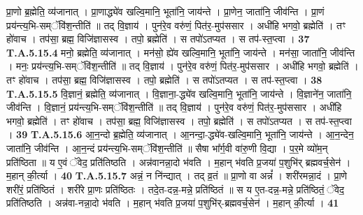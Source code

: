 \documentclass[17pt]{extarticle}
\begin{document}
                  प्रा॒णो ब्र॒ह्मेति॒ व्य॑जानात् । प्रा॒णाद्ध्ये॑व खल्वि॒मानि॒ भूता॑नि॒ जाय॑न्ते । प्रा॒णेन॒ जाता॑नि॒ जीव॑न्ति ।  प्रा॒णं प्रय॑न्त्य॒भि-सम्ॅवि॑श॒न्तीति॑ ॥ तद् वि॒ज्ञाय॑ ।  पुन॑रे॒व वरु॑णं॒ पित॑र॒-मुप॑ससार । अधी॑हि भगवो॒ ब्रह्मेति॑ । तꣳ हो॑वाच । तप॑सा॒ ब्रह्म॒ विजि॑ज्ञासस्व । तपो॒ ब्रह्मेति॑ । स तपो॑ऽतप्यत । स तप॑-स्त॒प्त्वा । \textbf{ 37} \newline
                  \newline
                                                                  \textbf{ T.A.5.15.4} \newline
                  मनो॒ ब्रह्मेति॒ व्य॑जानात् । मन॑सो॒ ह्ये॑व खल्वि॒मानि॒ भूता॑नि॒ जाय॑न्ते । मन॑सा॒ जाता॑नि॒ जीव॑न्ति । मनः॒ प्रय॑न्त्य॒भि-सम्ॅवि॑श॒न्तीति॑ ॥ तद् वि॒ज्ञाय॑ । पुन॑रे॒व वरु॑णं॒ पित॑र॒-मुप॑ससार । अधी॑हि भगवो॒ ब्रह्मेति॑ । तꣳ हो॑वाच । तप॑सा॒ ब्रह्म॒ विजि॑ज्ञासस्व ।  तपो॒ ब्रह्मेति॑ । स तपो॑ऽतप्यत । स तप॑-स्त॒प्त्वा । \textbf{ 38} \newline
                  \newline
                                                                  \textbf{ T.A.5.15.5} \newline
                  वि॒ज्ञानं॒ ब्रह्मेति॒ व्य॑जानात् ।  वि॒ज्ञाना॒-द्ध्ये॑व खल्वि॒मानि॒ भूता॑नि॒ जाय॑न्ते ।  वि॒ज्ञाने॑न॒ जाता॑नि॒ जीव॑न्ति । वि॒ज्ञानं॒ प्रय॑न्त्य॒भि-सम्ॅवि॑श॒न्तीति॑ ॥  तद् वि॒ज्ञाय॑ । पुन॑रे॒व वरु॑णं॒ पित॑र॒-मुप॑ससार । अधी॑हि भगवो॒ ब्रह्मेति॑ । तꣳ हो॑वाच । तप॑सा॒ ब्रह्म॒ विजि॑ज्ञासस्व । तपो॒ ब्रह्मेति॑ । स तपो॑ऽतप्यत । स तप॑-स्त॒प्त्वा । \textbf{ 39} \newline
                  \newline
                                                                  \textbf{ T.A.5.15.6} \newline
                  आ॒न॒न्दो ब्र॒ह्मेति॒ व्य॑जानात् । आ॒नन्दा॒-द्ध्ये॑व-खल्वि॒मानि॒ भूता॑नि॒ जाय॑न्ते ।  आ॒न॒न्देन॒ जाता॑नि॒ जीव॑न्ति । आ॒न॒न्दं प्रय॑न्त्य॒भि-सम्ॅवि॑श॒न्तीति॑ ॥ सैषा भा᳚र्ग॒वी वा॑रु॒णी वि॒द्या । प॒र॒मे व्यो॑म॒न् प्रति॑ष्ठिता ॥ य ए॒वं ॅवेद॒ प्रति॑तिष्ठति । अन्न॑वानन्ना॒दो भ॑वति ।  म॒हान् भ॑वति प्र॒जया॑ प॒शुभि॑र् ब्रह्मवर्च॒सेन॑ ।  म॒हान् की॒र्त्या । \textbf{ 40} \newline
                  \newline
                                                                  \textbf{ T.A.5.15.7} \newline
                  अन्नं॒ न नि॑न्द्यात् । तद् व्र॒तं ॥ प्रा॒णो वा अन्नं᳚ । शरी॑रमन्ना॒दं । प्रा॒णे शरी॑रं॒ प्रति॑ष्ठितं । शरी॑रे प्रा॒णः प्रति॑ष्ठितः ।  तदे॒त-दन्न॒-मन्ने॒ प्रति॑ष्ठितं ॥  स य ए॒त-दन्न॒-मन्ने॒ प्रति॑ष्ठितं॒ ॅवेद॒ प्रति॑तिष्ठति । अन्न॑वा-नन्ना॒दो भ॑वति ।  म॒हान् भ॑वति प्र॒जया॑ प॒शुभि॑र्-ब्रह्मवर्च॒सेन॑ ।  म॒हान् की॒र्त्या । \textbf{ 41} \newline
\end{document}
